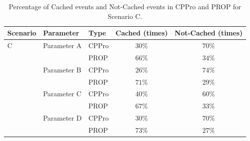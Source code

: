 \documentclass[10pt,final,journal,a4paper]{IEEEtran}
\begin{document}
\begin{table}[!t]
\caption{Percentage of Cached events and Not-Cached events in CPPro and PROP for Scenario C.}
\label{tab:stacked1scc}
\centering
\begin{tabular}{|l|l|l|c|c|}
\hline
Scenario & Parameter & Type & Cached (times)& Not-Cached (times) \\ %
\hline
C & Parameter A & CPPro &  $30\%$ & $70\%$ \\%
\hline
 &  & PROP & $66\%$ & $34\%$ \\ %
\hline

& Parameter B & CPPro & $26\%$ & $74\%$ \\ %
\hline
& & PROP & $71\%$ & $29\%$ \\%
\hline
& Parameter C & CPPro & $40\%$ & $60\%$  \\%
\hline
 & & PROP & $67\%$ & $33\%$ \\%
\hline

& Parameter D & CPPro & $30\%$ & $70\%$  \\%
\hline
 & & PROP & $73\%$ & $27\%$ \\%
\hline

\end{tabular}
\end{table}
\end{document}

